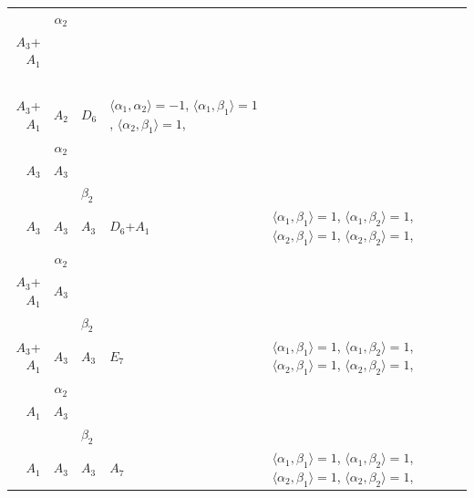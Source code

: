 \documentclass[12pt]{report}
\begin{document}
\begin{appendix}
{\begin{longtable}{rcl p{1cm}p{1cm}p{3cm} }
\\
\begin{tabular}{cc}$\alpha_1$+ & $\alpha_2$\\\tiny{ $A_3$+$A_1$ } & \tiny{  }\end{tabular} &\begin{tabular}{c} = \\~ \end{tabular} & \begin{tabular}{c}$\beta_1$\\\tiny{ $A_3$+$A_1$ }\end{tabular} & $A_2$ & $D_6$ & $\langle\alpha_1, \alpha_2\rangle=-1$,  $\langle\alpha_1, \beta_1\rangle=1$, $\langle\alpha_2, \beta_1\rangle=1$, 
\\
\begin{tabular}{cc}$\alpha_1$+ & $\alpha_2$\\\tiny{ $A_3$ } & \tiny{ $A_3$ }\end{tabular} &\begin{tabular}{c} = \\~ \end{tabular} & \begin{tabular}{cc}$\beta_1$+ & $\beta_2$\\\tiny{ $A_3$ } & \tiny{ $A_3$ }\end{tabular} & $A_3$ & $D_6$+$A_1$ &  $\langle\alpha_1, \beta_1\rangle=1$, $\langle\alpha_1, \beta_2\rangle=1$, $\langle\alpha_2, \beta_1\rangle=1$, $\langle\alpha_2, \beta_2\rangle=1$, 
\\
\begin{tabular}{cc}$\alpha_1$+ & $\alpha_2$\\\tiny{ $A_3$+$A_1$ } & \tiny{ $A_3$ }\end{tabular} &\begin{tabular}{c} = \\~ \end{tabular} & \begin{tabular}{cc}$\beta_1$+ & $\beta_2$\\\tiny{ $A_3$+$A_1$ } & \tiny{ $A_3$ }\end{tabular} & $A_3$ & $E_7$ &  $\langle\alpha_1, \beta_1\rangle=1$, $\langle\alpha_1, \beta_2\rangle=1$, $\langle\alpha_2, \beta_1\rangle=1$, $\langle\alpha_2, \beta_2\rangle=1$, 
\\
\begin{tabular}{cc}$\alpha_1$+ & $\alpha_2$\\\tiny{ $A_1$ } & \tiny{ $A_3$ }\end{tabular} &\begin{tabular}{c} = \\~ \end{tabular} & \begin{tabular}{cc}$\beta_1$+ & $\beta_2$\\\tiny{ $A_1$ } & \tiny{ $A_3$ }\end{tabular} & $A_3$ & $A_7$ &  $\langle\alpha_1, \beta_1\rangle=1$, $\langle\alpha_1, \beta_2\rangle=1$, $\langle\alpha_2, \beta_1\rangle=1$, $\langle\alpha_2, \beta_2\rangle=1$, 

\end{longtable}}
\end{appendix}
\end{document}
